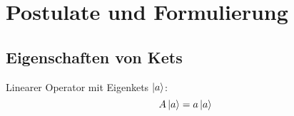 \section{Postulate und Formulierung}

\subsection{Eigenschaften von Kets}

Linearer Operator mit Eigenkets $\ket{a}$:
 \[ A \ket{a} = a \ket{a} \]